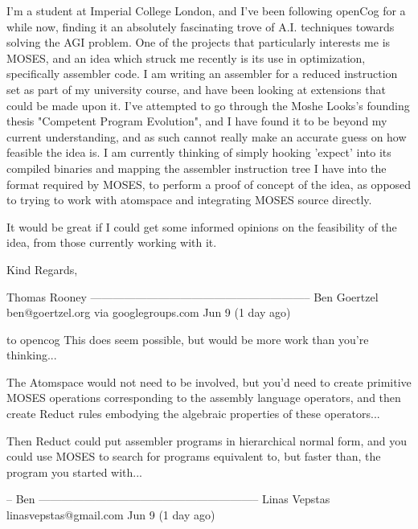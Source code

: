 \documentclass[11pt]{article}
\begin{document}
I'm a student at Imperial College London, and I've been following
openCog for a while now, finding it an absolutely fascinating trove of A.I. techniques towards solving the AGI problem. One of the projects that particularly interests me is MOSES, and an idea which struck me recently is its use in optimization, specifically assembler code. 
I am writing an assembler for a reduced instruction set as part of my university course, and have been looking at extensions that could be made upon it. I've attempted to go through the Moshe Looks's founding thesis "Competent Program Evolution", and I have found it to be beyond my current understanding, and as such cannot really make an accurate guess on how feasible the idea is. I am currently thinking of simply hooking 'expect' into its compiled binaries and mapping the assembler instruction tree I have into the format required by MOSES, to perform a proof of concept of the idea, as opposed to trying to work with atomspace and integrating MOSES source directly.

It would be great if I could get some informed opinions on the feasibility of the idea, from those currently working with it.

Kind Regards,

Thomas Rooney
-----------------------------------------------------------
Ben Goertzel ben@goertzel.org via googlegroups.com 
Jun 9 (1 day ago)

to opencog 
This does seem possible, but would be more work than you're thinking...

The Atomspace would not need to be involved, but you'd need to create
primitive MOSES operations corresponding to the assembly language
operators, and then create Reduct rules embodying the algebraic
properties of these operators...

Then Reduct could put assembler programs in hierarchical normal form,
and you could use MOSES to search for programs equivalent to, but
faster than, the program you started with...

-- Ben
-----------------------------------------------------------
Linas Vepstas linasvepstas@gmail.com
Jun 9 (1 day ago)
\end{document}
